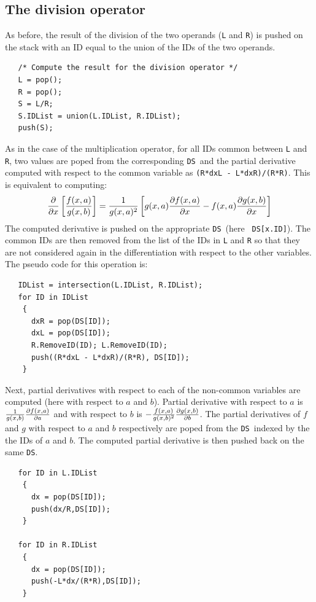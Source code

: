 \documentclass[acmtoms,acmnow]{acmtrans2m}
\newcommand{\DS}{{\tt DS}}
\begin{document}
%
%
\subsection{The division operator}

As before, the result of the division of the two operands ({\tt L} and
{\tt R}) is pushed on the stack with an ID equal to the union of the
IDs of the two operands.
\begin{verbatim}
   /* Compute the result for the division operator */
   L = pop();  
   R = pop();
   S = L/R;
   S.IDList = union(L.IDList, R.IDList);
   push(S);
\end{verbatim}
As in the case of the multiplication operator, for all IDs common
between {\tt L} and {\tt R}, two values are poped from the
corresponding \DS\ and the partial derivative computed with respect to
the common variable as {\tt (R*dxL - L*dxR)/(R*R)}.  This is
equivalent to computing:
\begin{equation}
{\partial \over {\partial x}}\left[{f(x,a) \over g(x,b)}\right] =
{1 \over g(x,a)^2}\left[{g(x,a) {{\partial f(x,a)} \over  {\partial
x}}} - f(x,a) {{\partial g(x,b)} \over {\partial x}}\right] 
\end{equation}
The computed derivative is pushed on the appropriate \DS\ (here {\tt
DS[x.ID]}).  The common IDs are then removed from the list of the IDs
in {\tt L} and {\tt R} so that they are not considered again in the
differentiation with respect to the other variables.  The pseudo code
for this operation is:
\begin{verbatim}
   IDList = intersection(L.IDList, R.IDList);
   for ID in IDList
    {
      dxR = pop(DS[ID]); 
      dxL = pop(DS[ID]);
      R.RemoveID(ID); L.RemoveID(ID);
      push((R*dxL - L*dxR)/(R*R), DS[ID]);
    }
\end{verbatim}
Next, partial derivatives with respect to each of the non-common
variables are computed (here with respect to $a$ and $b$).  Partial
derivative with respect to $a$ is ${1 \over g(x,b)} {\partial f(x,a)
\over \partial a}$ and with respect to $b$ is $-{f(x,a) \over
{g(x,b)^2}}{\partial g(x,b) \over \partial b}$.  The partial
derivatives of $f$ and $g$ with respect to $a$ and $b$ respectively
are poped from the \DS\ indexed by the the IDs of $a$ and $b$.  The
computed partial derivative is then pushed back on the same \DS.
\begin{verbatim}
   for ID in L.IDList
    {
      dx = pop(DS[ID]); 
      push(dx/R,DS[ID]);
    }

   for ID in R.IDList
    {
      dx = pop(DS[ID]);
      push(-L*dx/(R*R),DS[ID]);
    }
\end{verbatim}
\end{document}
